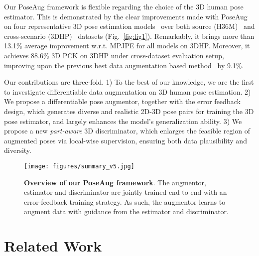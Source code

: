 \documentclass[final]{cvpr}
\begin{document}
Our PoseAug framework is flexible regarding the choice of the 3D human pose estimator.
This is demonstrated by the clear improvements made with PoseAug on four representative 3D pose estimation models~\cite{zhao2019semantic,martinez2017simple,pavllo2019videopose3d,cai2019exploiting} over both source (H36M)~\cite{ionescu2014human3} and cross-scenario (3DHP)~\cite{mehta2017vnect} datasets (Fig.~\ref{fig:fig1}).
Remarkably, it brings more than 13.1\% average improvement w.r.t. MPJPE for all models  on 3DHP.
Moreover, it achieves 88.6\% 3D PCK on 3DHP under cross-dataset evaluation setup, improving upon the previous best data augmentation based method~\cite{Li_2020_CVPR} by 9.1\%.

Our contributions are three-fold. 
1) To the best of our knowledge, we are the first to investigate differentiable data augmentation on 3D human pose estimation. 
2) We propose a differentiable pose augmentor, together with the error feedback design, which generates diverse and realistic 2D-3D pose pairs for training the 3D pose estimator, and largely enhances the model's generalization ability.
3) We propose a new \textit{part-aware} 3D discriminator, which enlarges the feasible region of augmented poses via local-wise supervision, ensuring both data plausibility and diversity.

\begin{figure}[!t]
\centering
\texttt{[image: figures/summary\_v5.jpg]}
\caption{\textbf{Overview of our PoseAug framework}. The augmentor, estimator and discriminator are jointly trained  end-to-end with an error-feedback training strategy. 
As such, the augmentor learns to augment data with  guidance from the estimator and   discriminator.}
\label{fig:overview}
\end{figure} 

\section{Related Work}
\end{document}
